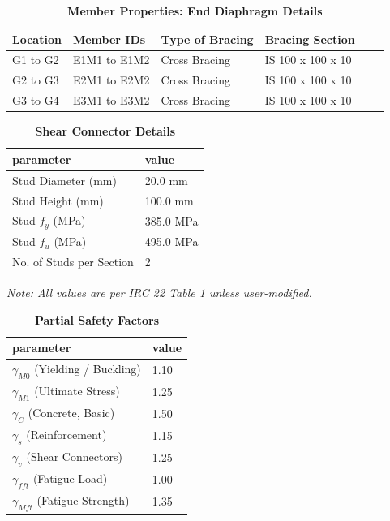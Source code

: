 \documentclass[12pt,a4paper]{report}
\numberwithin{table}{chapter}
\numberwithin{figure}{chapter}
\begin{document}
\begin{longtable}{|L{2.2cm}|L{2.2cm}|L{3.0cm}|L{2.5cm}|C{1.8cm}|C{1.8cm}|}
\caption{\textbf{Member Properties: End Diaphragm Details}}
\hline
\textbf{Location} & \textbf{Member IDs} & \textbf{Type of Bracing} & \textbf{Bracing Section} \\
\hline
G1 to G2 & E1M1 to E1M2 & Cross Bracing & IS 100 x 100 x 10 \\[6pt]
\hline
G2 to G3 & E2M1 to E2M2 & Cross Bracing & IS 100 x 100 x 10 \\[6pt]
\hline
G3 to G4 & E3M1 to E3M2 & Cross Bracing & IS 100 x 100 x 10 \\[6pt]
\hline
\end{longtable}



\label{subsec:shear-connectors}

\vspace{2.2em}

\vspace{0.4em}
\begin{longtable}{|L{5.5cm}|p{10.0cm}|}
\caption{\textbf{Shear Connector Details}}
\hline
\textbf{parameter} & \textbf{value} \\
\hline
\textnormal{Stud Diameter (mm)} & 20.0 mm \\[6pt]
\hline
\textnormal{Stud Height (mm)} & 100.0 mm \\[6pt]
\hline
\textnormal{Stud $f_y$ (MPa)} & 385.0 MPa \\[6pt]
\hline
\textnormal{Stud $f_u$ (MPa)} & 495.0 MPa \\[6pt]
\hline
\textnormal{No. of Studs per Section} & 2 \\[6pt]
\hline
\end{longtable}



\label{subsec:safety-factors}

\vspace{2.2em}

\vspace{0.3em}
\noindent\textit{Note: All values are per IRC 22 Table 1 unless user-modified.}

\vspace{0.4em}
\begin{longtable}{|L{5.5cm}|p{10.0cm}|}
\caption{\textbf{Partial Safety Factors}}
\hline
\textbf{parameter} & \textbf{value} \\
\hline
\textnormal{$\gamma_{M0}$ (Yielding / Buckling)} & 1.10 \\[6pt]
\hline
\textnormal{$\gamma_{M1}$ (Ultimate Stress)} & 1.25 \\[6pt]
\hline
\textnormal{$\gamma_C$ (Concrete, Basic)} & 1.50 \\[6pt]
\hline
\textnormal{$\gamma_s$ (Reinforcement)} & 1.15 \\[6pt]
\hline
\textnormal{$\gamma_v$ (Shear Connectors)} & 1.25 \\[6pt]
\hline
\textnormal{$\gamma_{fft}$ (Fatigue Load)} & 1.00 \\[6pt]
\hline
\textnormal{$\gamma_{Mft}$ (Fatigue Strength)} & 1.35 \\[6pt]
\hline
\end{longtable}
\end{document}

